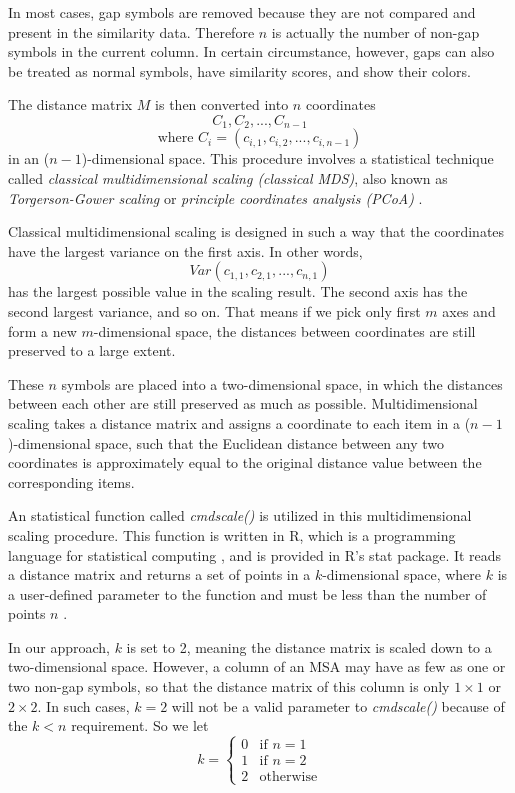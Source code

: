 In most cases, gap symbols are removed because they are not compared and present in the similarity data. Therefore $n$ is actually the number of non-gap symbols in the current column. In certain circumstance, however, gaps can also be treated as normal symbols, have similarity scores, and show their colors.

The distance matrix $M$ is then converted into $n$ coordinates $$C_1, C_2, ..., C_{n-1}$$$$\mbox{where } C_i=(c_{i,1}, c_{i,2}, ..., c_{i,n-1})$$ in an ($n-1$)-dimensional space. This procedure involves a statistical technique called \emph{classical multidimensional scaling (classical MDS)}, also known as \emph{Torgerson-Gower scaling} or \emph{principle coordinates analysis (PCoA)} \cite{GOWER01121966}.

Classical multidimensional scaling is designed in such a way that the coordinates have the largest variance on the first axis. In other words, $$Var(c_{1,1}, c_{2,1}, ..., c_{n,1})$$ has the largest possible value in the scaling result. The second axis has the second largest variance, and so on. That means if we pick only first $m$ axes and form a new $m$-dimensional space, the distances between coordinates are still preserved to a large extent.

These $n$ symbols are placed into a two-dimensional space, in which the distances between each other are still preserved as much as possible.  Multidimensional scaling takes a distance matrix and assigns a coordinate to each item in a ($n-1$)-dimensional space, such that the Euclidean distance between any two coordinates is approximately equal to the original distance value between the corresponding items.

An statistical function called \emph{cmdscale()} \cite{R2009aa} is utilized in this multidimensional scaling procedure. This function is written in R, which is a programming language for statistical computing \cite{Gentleman:aa}, and is provided in R’s stat package. It reads a distance matrix and returns a set of points in a $k$-dimensional space, where $k$ is a user-defined parameter to the function and must be less than the number of points $n$ \cite{Cailliez:1983aa,Cox:2008aa}.

In our approach, $k$ is set to 2, meaning the distance matrix is scaled down to a two-dimensional space. However, a column of an MSA may have as few as one or two non-gap symbols, so that the distance matrix of this column is only $1 \times 1$ or $2 \times 2$. In such cases, $k=2$ will not be a valid parameter to \emph{cmdscale()} because of the $k<n$ requirement. So we let
\[
k = \left\{ \begin{array}{ll}
0 & \mbox{if $n=1$} \\
1 & \mbox{if $n=2$} \\
2 & \mbox{otherwise}
\end{array}
\right.
\]

